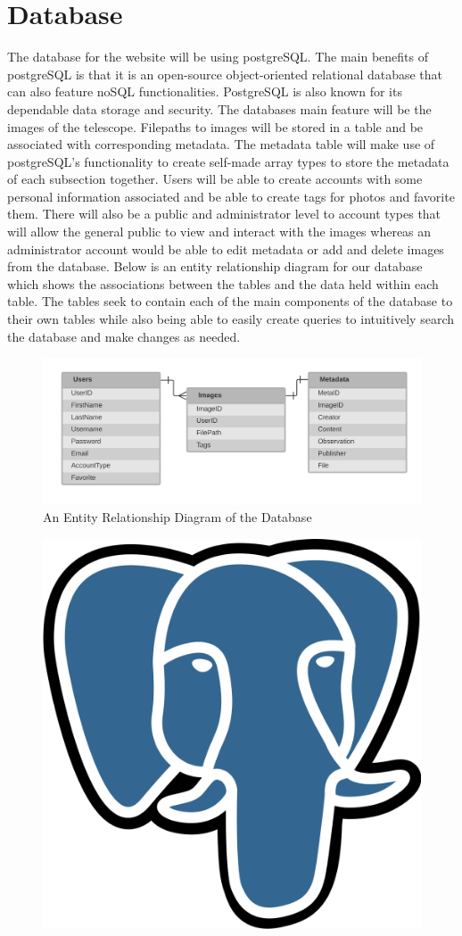 \documentclass[12pt]{article}
\begin{document}
\section{Database}

The database for the website will be using postgreSQL.  The main benefits of postgreSQL is that it is an open-source object-oriented relational database that can also feature noSQL functionalities.  PostgreSQL is also known for its dependable data storage and security.  The databases main feature will be the images of the telescope.  Filepaths to images will be stored in a table and be associated with corresponding metadata.  The metadata table will make use of postgreSQL’s functionality to create self-made array types to store the metadata of each subsection together.  Users will be able to create accounts with some personal information associated and be able to create tags for photos and favorite them.  There will also be a public and administrator level to account types that will allow the general public to view and interact with the images whereas an administrator account would be able to edit metadata or add and delete images from the database.
Below is an entity relationship diagram for our database which shows the associations between the tables and the data held within each table.  The tables seek to contain each of the main components of the database to their own tables while also being able to easily create queries to intuitively search the database and make changes as needed.

\begin{figure}[h]
	\centering
	\includegraphics[width=\linewidth]{database}
	\caption{An Entity Relationship Diagram of the Database}
	\label{fig:ERD}
\end{figure}

\begin{figure}[h]
	\centering
	\includegraphics[width=0.251\linewidth]{postgresql}
\end{figure}
\end{document}
